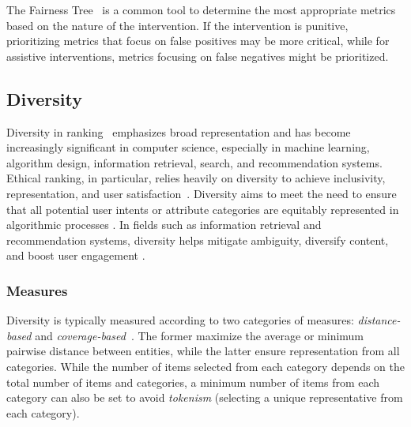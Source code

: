 The Fairness Tree~\cite{ saleiro2020dealing} is a common tool to determine the most appropriate metrics based on the nature of the intervention. If the intervention is punitive, prioritizing metrics that focus on false positives may be more critical, while for assistive interventions, metrics focusing on false negatives might be prioritized.




\subsection{Diversity}
\label{sec:diversity}

Diversity in ranking~\cite{DBLP:journals/sigmod/DrosouP10,DBLP:conf/sigmod/FraternaliMT12,DBLP:journals/tods/CatalloCFMT13} emphasizes broad representation and has become increasingly significant in computer science, especially in machine learning, algorithm design, information retrieval, search, and recommendation systems. Ethical ranking, in particular, relies heavily on diversity to achieve inclusivity, representation, and user satisfaction~\cite{stoyanovich2018online}.
% 
Diversity aims to
meet the need to ensure that all potential user intents or attribute categories are equitably represented in algorithmic processes \cite{wang2021user}. In fields such as information retrieval and recommendation systems, diversity helps mitigate ambiguity, diversify content, and boost user engagement \cite{pitoura2022fairness}.


\subsubsection{Measures}
\label{subsec:diversity_approaches}

Diversity is typically measured according to two categories of measures: \emph{distance-based} and \emph{coverage-based}~\cite{pitoura2022fairness}. The former maximize the average or minimum pairwise distance between entities, while the latter ensure representation from all categories. While the number of items selected from each category depends on the total number of items and categories, a minimum number of items from each category can also be set to avoid \emph{tokenism} (selecting a unique representative from each category).

